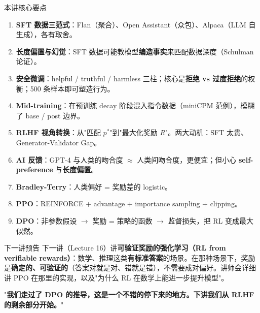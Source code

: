 \documentclass[a4paper]{article}
\begin{document}
\begin{knowledgebox}{本讲核心要点}
\begin{enumerate}
\item \textbf{SFT 数据三范式}：Flan（聚合）、Open Assistant（众包）、Alpaca（LLM 自生成），各有取舍。
\item \textbf{长度偏置与幻觉}：SFT 数据可能教模型\textbf{编造事实}来匹配数据深度（Schulman 论证）。
\item \textbf{安全微调}：helpful / truthful / harmless 三柱；核心是\textbf{拒绝 vs 过度拒绝}的权衡；500 条样本即可塑造行为。
\item \textbf{Mid-training}：在预训练 decay 阶段混入指令数据（miniCPM 范例），模糊了 base / post 边界。
\item \textbf{RLHF 视角转换}：从"匹配 $p^*$"到"最大化奖励 $R$"。两大动机：SFT 太贵、Generator-Validator Gap。
\item \textbf{AI 反馈}：GPT-4 与人类的吻合度 $\approx$ 人类间吻合度，更便宜；但小心 \textbf{self-preference} 与\textbf{长度偏置}。
\item \textbf{Bradley-Terry}：人类偏好 = 奖励差的 logistic。
\item \textbf{PPO}：REINFORCE + advantage + importance sampling + clipping。
\item \textbf{DPO}：非参数假设 $\to$ 奖励 = 策略的函数 $\to$ 监督损失，把 RL 变成最大似然。
\end{enumerate}
\end{knowledgebox}

\begin{practicebox}{下一讲预告}
下一讲（Lecture 16）讲\textbf{可验证奖励的强化学习（RL from verifiable rewards）}：数学、推理这类\textbf{有标准答案}的场景。在那种场景下，奖励是\textbf{确定的、可验证的}（答案对就是对、错就是错），不需要成对偏好。讲师会详细讲 PPO 在那里的实现，以及"为什么 RL 在数学上能进一步提升模型"。

"\textbf{我们走过了 DPO 的推导，这是一个不错的停下来的地方。下讲我们从 RLHF 的剩余部分开始。}"
\end{practicebox}
\end{document}
